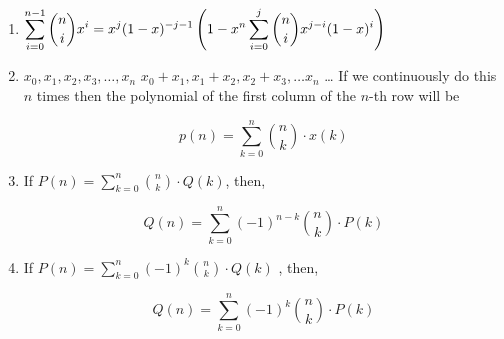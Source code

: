 \begin{enumerate}
    $= \displaystyle \sum_{i=0}^{n} \sum_{j=0}^{k} \frac{n!}{(n-i)!} \cdot  \left\{\begin{matrix} k \\ j \end{matrix} \right\} \cdot \frac{1}{(i-j)!}$  
    $= n!\displaystyle \sum_{i=0}^{n} \sum_{j=0}^{k} \left\{ \begin{matrix} k \\ j \end{matrix} \right\} \cdot \frac{1}{(n-i)!} \cdot \frac{1}{(i-j)!}$  
    $= n!\displaystyle \sum_{i=0}^{n} \sum_{j=0}^{k} \left\{ \begin{matrix} k \\ j \end{matrix} \right\} \cdot { \binom{n-j}{n-i}} \cdot \frac{1}{(n-j)!}$  
    $= n!\displaystyle \sum_{j=0}^{k} \left\{ \begin{matrix} k \\ j \end{matrix} \right\} \cdot \frac{1}{(n-j)!} \sum_{i=0}^{n} \cdot { \binom{n-j}{n-i}}$  
    $= \displaystyle \sum_{j=0}^{k} \left\{\begin{matrix} k \\ j \end{matrix} \right\} \cdot n^{\underline{j}} \cdot 2^{n-j}$
    
    Here $n^{\underline{j}}=P(n,j)=\dfrac{n!}{(n-j)!}$ and $\displaystyle \left\{ \begin{matrix} k \\ j \end{matrix} \right\}$ is stirling number of the second kind.
    
    So, instead of $O(n)$, now you can calculate the original equation in $O(k^2)$ or even in $O(k \log^2 n)$ using NTT.
\item $\displaystyle \displaystyle \sum \limits_{i=0}^{n-1} {\binom{n}{i}} x^i = x^j(1-x)^{-j-1}\left( 1- x^n \sum \limits_{i=0}^j {\binom{n}{i}} x^{j-i} (1-x)^i \right)$
\item $\displaystyle x_{0}, x_{1}, x_{2}, x_{3},  \ldots  , x_{n}$  
    $\displaystyle x_{0} + x_{1}, x_{1} + x_{2}, x_{2}+x_{3},  \ldots  x_{n}$  
     \ldots   
    If we continuously do this $n$ times then the polynomial of the first column of the $n$-th row will be
    
    $$\displaystyle p(n)=\sum_{k=0}^{n}{\binom{n}{k}} \cdot x(k)$$
\item If $\displaystyle P(n)=\sum_{k=0}^{n}{\binom{n}{k}} \cdot Q(k)$,
    then, 
    
    $$
    Q(n)=\sum_{k=0}^{n}(-1)^{n-k}{\binom{n}{k}} \cdot P(k) 
    $$
\item  If $\displaystyle P(n)=\sum_{k=0}^{n}(-1)^{k}{\binom{n}{k}} \cdot Q(k)$ ,
    then, 
    
    $$
    Q(n)=\sum_{k=0}^{n}(-1)^{k}{\binom{n}{k}} \cdot P(k)
    $$
\end{enumerate}

